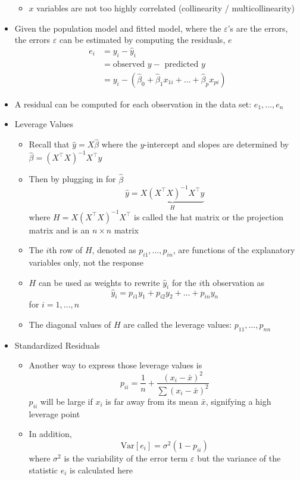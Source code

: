 \documentclass[12pt]{article}
\begin{document}
\begin{itemize}
\begin{itemize}
\item $x$ variables are not too highly correlated (collinearity / multicollinearity) \end{itemize} 
\item Given the population model and fitted model, where the $\varepsilon$'s are the errors, the errors $\varepsilon$ can be estimated by computing the residuals, $e$ $$ \begin{aligned} e_i &= y_i - \hat{y}_i \\ &= \text{observed } y - \text{ predicted } y \\ &= y_i - (\hat{\beta}_0 + \hat{\beta}_1x_{1i} + \dots + \hat{\beta}_px_{pi}) \end{aligned} $$ 
\item A residual can be computed for each observation in the data set: $e_1,\dots,e_n$ 
\item Leverage Values \begin{itemize} 
\item Recall that $\hat{y} = X\hat{\beta}$ where the $y$-intercept and slopes are determined by $\hat{\beta} = (X^\top X)^{-1}X^\top y $ 
\item Then by plugging in for $\hat{\beta}$ 
$$ \hat{y} = \underbrace{X(X^\top X)^{-1}X^\top y}_{H} $$ 
where $H = X(X^\top X)^{-1}X^\top$ is called the hat matrix or the projection matrix and is an $n \times n$ matrix 
\item The $i$th row of $H$, denoted as $p_{i1},\dots,p_{in}$, are functions of the explanatory variables only, not the response
\item $H$ can be used as weights to rewrite $\hat{y}_i$ for the $i$th observation as $$ \hat{y}_i = p_{i1}y_1 + p_{i2}y_2 + \dots + p_{in}y_n $$ for $i=1,\dots,n$
\item The diagonal values of $H$ are called the leverage values: $p_{11},\dots,p_{nn}$ 
\end{itemize} 
\item Standardized Residuals \begin{itemize} 
\item Another way to express those leverage values is $$ p_{ii} = \frac{1}{n} + \frac{(x_i - \bar{x})^2}{\sum (x_i - \bar{x})^2} $$ 
$p_{ii}$ will be large if $x_i$ is far away from its mean $\bar{x}$, signifying a high leverage point 
\item In addition, $$\text{Var}[e_i] = \sigma^2(1 - p_{ii}) $$ where $\sigma^2$ is the variability of the error term $\varepsilon$ but the variance of the statistic $e_i$ is calculated here 

\end{itemize}
\end{itemize}
\end{document}
